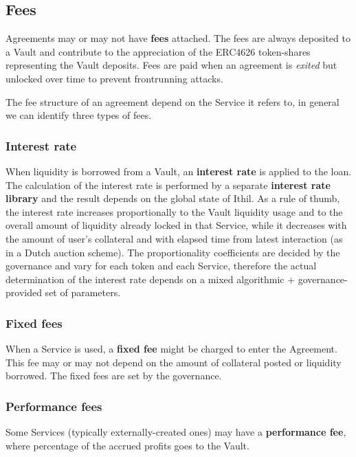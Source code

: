 \documentclass[a4paper,10 pt]{article}
\theoremstyle{definition}
\begin{document}
\subsection{Fees}\label{feeSub}

Agreements may or may not have {\bf fees} attached. The fees are always deposited to a Vault and contribute to the appreciation of the ERC4626 token-shares representing the Vault deposits. Fees are paid when an agreement is {\it exited} but unlocked over time to prevent frontrunning attacks.

The fee structure of an agreement depend on the Service it refers to, in general we can identify three types of fees.

\subsubsection{Interest rate}\label{interestRateSubSub}
When liquidity is borrowed from a Vault, an {\bf interest rate} is applied to the loan. The calculation of the interest rate is performed by a separate {\bf interest rate library} and the result depends on the global state of Ithil. As a rule of thumb, the interest rate increases proportionally to the Vault liquidity usage and to the overall amount of liquidity already locked in that Service, while it decreases with the amount of user's collateral and with elapsed time from latest interaction (as in a Dutch auction scheme). The proportionality coefficients are decided by the governance and vary for each token and each Service, therefore the actual determination of the interest rate depends on a mixed algorithmic + governance-provided set of parameters.

\subsubsection{Fixed fees}\label{fixedFeesSubSub}
When a Service is used, a {\bf fixed fee} might be charged to enter the Agreement. This fee may or may not depend on the amount of collateral posted or liquidity borrowed. The fixed fees are set by the governance.

\subsubsection{Performance fees}\label{fixedFeesSubSub}
Some Services (typically externally-created ones) may have a {\bf performance fee}, where percentage of the accrued profits goes to the Vault.
\end{document}
